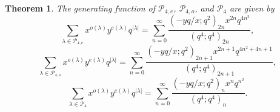 \documentclass[12pt]{amsart}
\newtheorem{theorem}{Theorem}[section]
\theoremstyle{definition}
\theoremstyle{remark}
\numberwithin{equation}{section}
\begin{document}
\begin{theorem}\label{thm:P4Gen}
The generating function of $\mathcal{P}_{4,e}$, $\mathcal{P}_{4,o}$, and $\mathcal{P}_4$ are given by
\begin{equation}\label{eq:P4eGen}
\sum_{\lambda\in\mathcal{P}_{4,e}}x^{o(\lambda)}y^{e(\lambda)}q^{|\lambda|}=\sum_{n=0}^{\infty}\frac{(-yq/x;q^2)_{2n}x^{2n}q^{4n^2}}{(q^4;q^4)_{2n}},
\end{equation}
\begin{equation}\label{eq:P4oGen}
\sum_{\lambda\in\mathcal{P}_{4,o}}x^{o(\lambda)}y^{e(\lambda)}q^{|\lambda|}=\sum_{n=0}^{\infty}\frac{(-yq/x;q^2)_{2n+1}x^{2n+1}q^{4n^2+4n+1}}{(q^4;q^4)_{2n+1}},
\end{equation}
\begin{equation}\label{eq:P4gen}
\sum_{\lambda\in\mathcal{P}_4}x^{o(\lambda)}y^{e(\lambda)}q^{|\lambda|}=\sum_{n=0}^{\infty}\frac{(-yq/x;q^2)_{n}x^{n}q^{n^2}}{(q^4;q^4)_{n}}.    
\end{equation}
\end{theorem}
\end{document}
